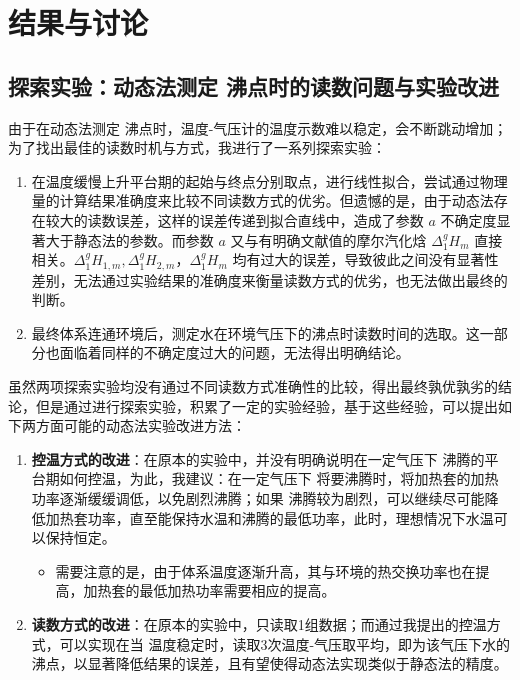 \section{结果与讨论}

\subsection{探索实验：动态法测定  沸点时的读数问题与实验改进}

由于在动态法测定  沸点时，温度-气压计的温度示数难以稳定，会不断跳动增加；为了找出最佳的读数时机与方式，我进行了一系列探索实验：
\begin{enumerate}
    \item 在温度缓慢上升平台期的起始与终点分别取点，进行线性拟合，尝试通过物理量的计算结果准确度来比较不同读数方式的优劣。但遗憾的是，由于动态法存在较大的读数误差，这样的误差传递到拟合直线中，造成了参数 $a$ 不确定度显著大于静态法的参数。而参数 $a$ 又与有明确文献值的摩尔汽化焓 $\Delta_1^{g} H_{m}$ 直接相关。$\Delta_1^{g} H_{1,m}, \Delta_1^{g} H_{2,m}，\Delta_1^{g} H_{m}$ 均有过大的误差，导致彼此之间没有显著性差别，无法通过实验结果的准确度来衡量读数方式的优劣，也无法做出最终的判断。
    \item 最终体系连通环境后，测定水在环境气压下的沸点时读数时间的选取。这一部分也面临着同样的不确定度过大的问题，无法得出明确结论。
\end{enumerate}

虽然两项探索实验均没有通过不同读数方式准确性的比较，得出最终孰优孰劣的结论，但是通过进行探索实验，积累了一定的实验经验，基于这些经验，可以提出如下两方面可能的动态法实验改进方法：
\begin{enumerate}
    \item \textbf{控温方式的改进}：在原本的实验\cite{pcl2002}中，并没有明确说明在一定气压下  沸腾的平台期如何控温，为此，我建议：在一定气压下  将要沸腾时，将加热套的加热功率逐渐缓缓调低，以免剧烈沸腾；如果  沸腾较为剧烈，可以继续尽可能降低加热套功率，直至能保持水温和沸腾的最低功率，此时，理想情况下水温可以保持恒定。
    \begin{itemize}
        \item 需要注意的是，由于体系温度逐渐升高，其与环境的热交换功率也在提高，加热套的最低加热功率需要相应的提高。
    \end{itemize}
    \item \textbf{读数方式的改进}：在原本的实验\cite{pcl2002}中，只读取1组数据；而通过我提出的控温方式，可以实现在当  温度稳定时，读取3次温度-气压取平均，即为该气压下水的沸点，以显著降低结果的误差，且有望使得动态法实现类似于静态法的精度。
\end{enumerate}

